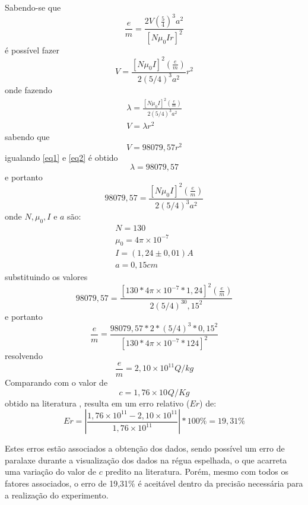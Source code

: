 Sabendo-se que
\begin{equation}
	\frac{e}{m}=\frac{2V\left(\frac{5}{4}\right)^3a^2}{[N\mu _0 Ir]^2}
\end{equation}
é possível fazer
\begin{equation}
	V = \frac{[N \mu _0 I]^2\left(\frac{e}{m}\right)}{2(5/4)^3a^2}r^2
\end{equation}
onde fazendo
\begin{equation}
\begin{split}
	\lambda = \frac{[N \mu _0 I]^2\left(\frac{e}{m}\right)}{2(5/4)^3a^2}\\
	V = \lambda r^2
\label{eq1}
\end{split}
\end{equation}
sabendo que
\begin{equation}
	V = 98079,57r^2
\label{eq2}
\end{equation}
igualando \ref{eq1} e \ref{eq2} é obtido
\begin{equation*}
	\lambda = 98079,57
\end{equation*}
e portanto
\begin{equation}
	98079,57 =  \frac{[N \mu _0 I]^2\left(\frac{e}{m}\right)}{2(5/4)^3a^2}
\end{equation}
onde $N,\mu _0,I$ e $a$ são:
\begin{equation*}
	\begin{split}
		N=130\\
		\mu _0 =4\pi\times10^{-7}\\
		I=(1,24\pm0,01)A\\
		a=0,15cm
	\end{split}
\end{equation*}
substituindo os valores
\begin{equation}
	98079,57 =  \frac{[130*4\pi\times10^{-7}*1,24]^2\left(\frac{e}{m}\right)}{2(5/4)^30,15^2}
\end{equation}
e portanto
\begin{equation}
	\frac{e}{m}=\frac{98079,57*2*(5/4)^3*0,15^2}{[130*4\pi\times10^{-7}*124]^2}
\end{equation}
resolvendo
\begin{equation}
	\frac{e}{m}=2,10\times10^{11}Q/kg
\end{equation}
Comparando com o valor de 
\begin{equation}
	c=1,76\times10^{} Q/Kg
\end{equation}        
obtido na literatura \cite{PASCO}, resulta em um erro relativo ($Er$) de:
\begin{equation}
	Er=\left|\frac{1,76\times10^{11}-2,10\times10^{11}}{1,76\times10^{11}}\right|*100\%= 19,31\%
\end{equation}

Estes erros estão associados a obtenção dos dados, sendo
possível um erro de paralaxe durante a visualização dos dados na régua espelhada, o que acarreta uma variação do valor de $c$ predito na literatura. Porém, mesmo com todos os fatores associados, o erro  de
19,31\% é aceitável dentro da precisão necessária para a realização do experimento.


